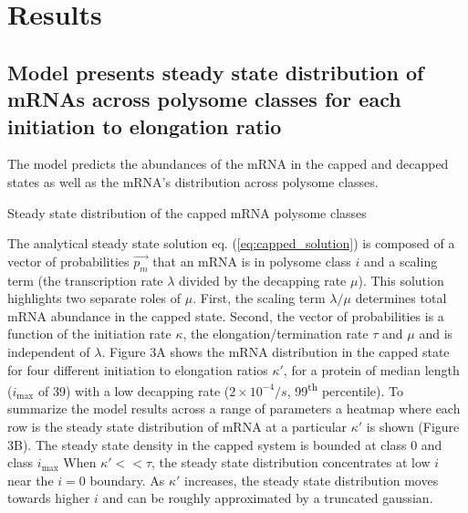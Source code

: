 \documentclass[a4,center,fleqn,nocrop]{NAR}
\newcommand{\imax}{\ensuremath{{i_{\max}}}\xspace}
\begin{document}
\section{Results}

\subsection{Model presents steady state distribution of mRNAs across polysome classes for each initiation to elongation ratio}

The model predicts the abundances of the mRNA in the capped and decapped states as well as the mRNA's distribution across polysome classes.

Steady state distribution of the capped mRNA polysome classes

The analytical steady state solution eq. (\ref{eq:capped_solution}) is composed of a vector of probabilities $\vec{p_m}$ that an mRNA is in polysome class $i$ and a scaling term (the transcription rate $\lambda$ divided by the decapping rate $\mu$). 
This solution highlights two separate roles of $\mu$. 
First, the scaling term $\lambda / \mu$ determines total mRNA abundance in the capped state. 
Second, the vector of probabilities is a function of the initiation rate $\kappa$, the elongation/termination rate $\tau$ and $\mu$ and is independent of $\lambda$.
Figure 3A shows the mRNA distribution in the capped state for four different initiation to elongation ratios $\kappa'$, for a protein of median length (\imax of 39) with a low decapping rate ($2\times10^{-4} /s$, 99\textsuperscript{th} percentile).
To summarize the model results across a range of parameters a heatmap where each row is the steady state distribution of mRNA at a particular $\kappa'$ is shown (Figure 3B).
The steady state density in the capped system is bounded at class 0 and class \imax 
When $\kappa'<<\tau$, the steady state distribution concentrates at low $i$ near the $i=0$ boundary.
As $\kappa'$ increases, the steady state distribution moves towards higher $i$ and can be roughly approximated by a truncated gaussian. 
\end{document}
